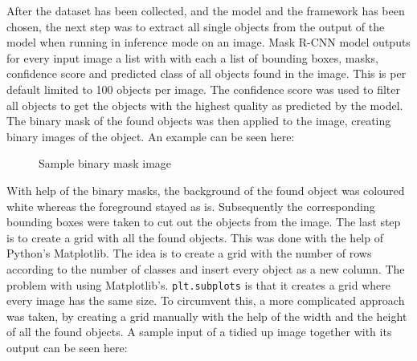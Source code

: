 After the dataset has been collected, and the model and the framework has been chosen, the next step was to extract all single objects from the output of the model when running in inference mode on an image. Mask R-CNN model outputs for every input image a list with with each a list of bounding boxes, masks, confidence score and predicted class of all objects found in the image. This is per default limited to 100 objects per image. The confidence score was used to filter all objects to get the objects with the highest quality as predicted by the model. The binary mask of the found objects was then applied to the image, creating binary images of the object. An example can be seen here:

\begin{figure}[H]
	\caption{\label{fig:binary-mask} Sample binary mask image}
\end{figure}

With help of the binary masks, the background of the found object was coloured white whereas the foreground stayed as is. Subsequently the corresponding bounding boxes were taken to cut out the objects from the image. The last step is to create a grid with all the found objects. This was done with the help of Python's Matplotlib. The idea is to create a grid with the number of rows according to the number of classes and insert every object as a new column. The problem with using Matplotlib's. \texttt{plt.subplots} is that it creates a grid where every image has the same size. To circumvent this, a more complicated approach was taken, by creating a grid manually with the help of the width and the height of all the found objects. A sample input of a tidied up image together with its output can be seen here:

